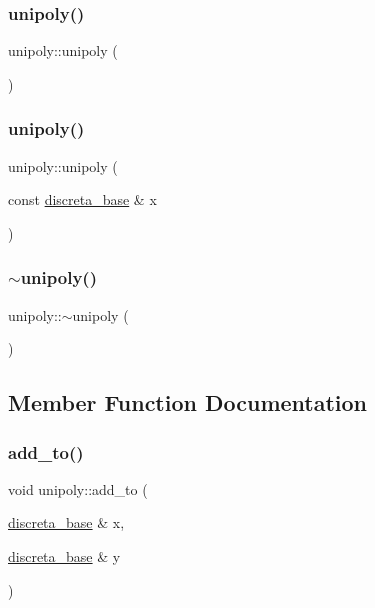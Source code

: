 \subsubsection{\texorpdfstring{unipoly()}{unipoly()}\hspace{0.1cm}{\footnotesize\ttfamily [1/2]}}
{\footnotesize\ttfamily unipoly\+::unipoly (\begin{DoxyParamCaption}{ }\end{DoxyParamCaption})}

\mbox{\label{classunipoly_ade3afe0b00b7ff45b9dbc5a15cacf59d}} 
\subsubsection{\texorpdfstring{unipoly()}{unipoly()}\hspace{0.1cm}{\footnotesize\ttfamily [2/2]}}
{\footnotesize\ttfamily unipoly\+::unipoly (\begin{DoxyParamCaption}\item[{const \mbox{\hyperlink{classdiscreta__base}{discreta\+\_\+base}} \&}]{x }\end{DoxyParamCaption})}

\mbox{\label{classunipoly_aff42843e3c959f1c5e58856784352890}} 
\subsubsection{\texorpdfstring{$\sim$unipoly()}{~unipoly()}}
{\footnotesize\ttfamily unipoly\+::$\sim$unipoly (\begin{DoxyParamCaption}{ }\end{DoxyParamCaption})}



\subsection{Member Function Documentation}
\mbox{\label{classunipoly_abebdaf912a2b0e7c27470f4191d0e180}} 
\subsubsection{\texorpdfstring{add\+\_\+to()}{add\_to()}}
{\footnotesize\ttfamily void unipoly\+::add\+\_\+to (\begin{DoxyParamCaption}\item[{\mbox{\hyperlink{classdiscreta__base}{discreta\+\_\+base}} \&}]{x,  }\item[{\mbox{\hyperlink{classdiscreta__base}{discreta\+\_\+base}} \&}]{y }\end{DoxyParamCaption})\hspace{0.3cm}{\ttfamily [virtual]}}



